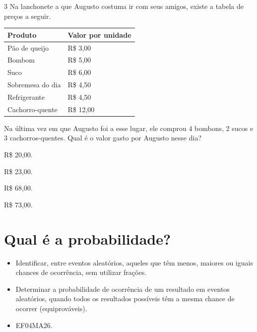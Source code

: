 \begin{mdframed}[linewidth=2pt,linecolor=salmao,roundcorner=2pt]
\num{3} Na lanchonete a que Augusto costuma ir com seus amigos, existe a tabela de preços a seguir.

\begin{longtable}[]{@{}ll@{}}
\toprule
Produto & Valor por unidade\tabularnewline
\midrule
\endhead
Pão de queijo & R\$ 3,00\tabularnewline
Bombom & R\$ 5,00\tabularnewline
Suco & R\$ 6,00\tabularnewline
Sobremesa do dia & R\$ 4,50\tabularnewline
Refrigerante & R\$ 4,50\tabularnewline
Cachorro-quente & R\$ 12,00\tabularnewline
\bottomrule
\end{longtable}

Na última vez em que Augusto foi a esse lugar, ele comprou 4 bombons, 2
sucos e 3 cachorros-quentes. Qual é o valor gasto por Augusto nesse dia?

\begin{escolha}
\item
  R\$ 20,00.
\item
  R\$ 23,00.
\item
  R\$ 68,00.
\item
  R\$ 73,00.
\end{escolha}


\chapter{Qual é a probabilidade?}


\begin{itemize}
\item Identificar, entre eventos aleatórios, aqueles que têm menos, maiores ou
iguais chances de ocorrência, sem utilizar frações.

\item Determinar a probabilidade de ocorrência de um resultado em eventos
aleatórios, quando todos os resultados possíveis têm a mesma chance de
ocorrer (equiprováveis).
\end{itemize}


\begin{itemize}
\item EF04MA26.
\end{itemize}



\end{mdframed}
